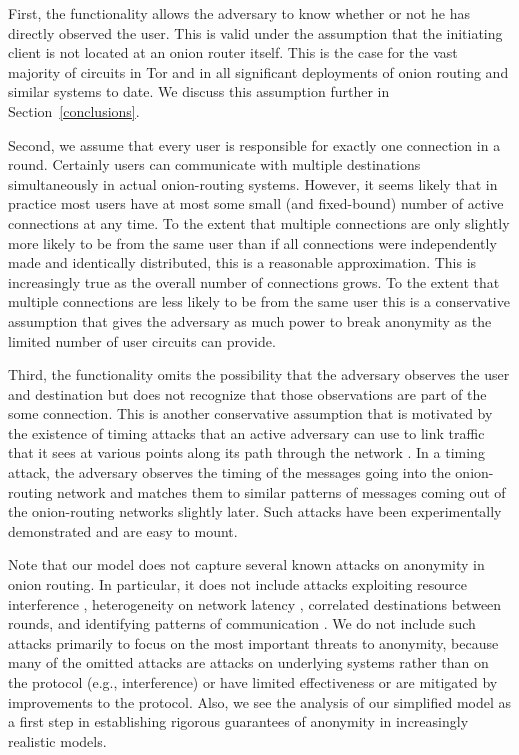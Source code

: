 \documentclass[prodmode,acmtissec]{acmsmall}
\begin{document}
First, the functionality allows the adversary to know whether or not he has directly observed the user. This is valid under the assumption that the initiating client is not located at an onion router itself. This is the case for the vast majority of circuits in Tor and in all significant deployments of onion routing and similar systems to date. We discuss this assumption further in Section~\ref{conclusions}.

Second, we assume that every user is
responsible for exactly one connection in a round.  Certainly users can
communicate with multiple destinations simultaneously in actual
onion-routing systems.  However, it seems likely that in practice most
users have at most some small (and fixed-bound) number of active
connections at any time. To the extent that multiple connections are
only slightly more likely to be from the same user than if all
connections were independently made and identically distributed, this
is a reasonable approximation. This is increasingly true as the
overall number of connections grows. To the extent that multiple
connections are less likely to be from the same user this is a
conservative assumption that gives the adversary as much power to
break anonymity as the limited number of user circuits can provide.

Third, the functionality omits the possibility that the adversary observes the user and destination but does not recognize that 
those observations are part of the some connection. This is another
conservative assumption that is motivated by the existence of timing
attacks that an active adversary can use to link traffic that it sees
at various points along its path through the network
\cite{onion-routing:pet2000}.  In a timing attack, the adversary
observes the timing of the messages going into the onion-routing
network and matches them to similar patterns of messages coming out of
the onion-routing networks slightly later.  Such attacks have been
experimentally demonstrated \cite{hs-attack06,bauer:wpes2007} and are
easy to mount.

Note that our model does not capture several known attacks on
anonymity in onion routing.  In particular, it does not include
attacks exploiting resource interference \cite{torta05,ccs06-hotclockskew},
heterogeneity on network latency \cite{tissec-latency-leak},
correlated destinations between rounds, and identifying patterns of
communication \cite{ccsw09-fingerprinting}.  We do not include such
attacks primarily to focus on the most important threats to anonymity,
because many of the omitted attacks are attacks on underlying systems
rather than on the protocol (e.g., interference) or have limited
effectiveness or are mitigated by improvements to the protocol.  Also,
we see the analysis of our simplified model as a first step in
establishing rigorous guarantees of anonymity in increasingly
realistic models.
\end{document}
